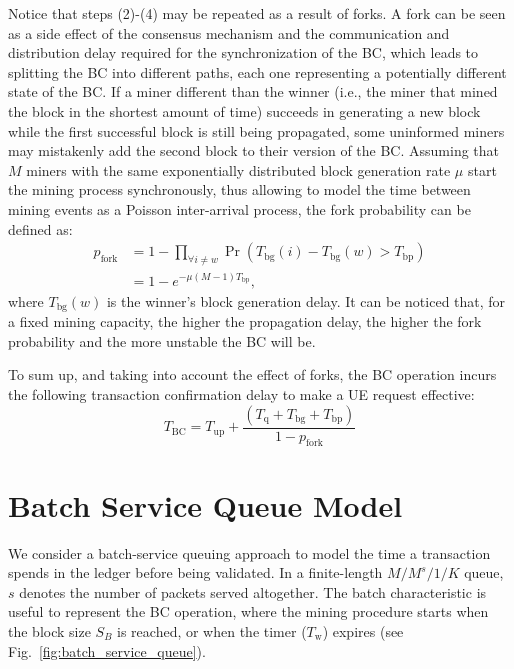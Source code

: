 \documentclass[conference]{IEEEtran}
\theoremstyle{definition}
\begin{document}
Notice that steps (2)-(4) may be repeated as a result of forks. A fork can be seen as a side effect of the consensus mechanism and the communication and distribution delay required for the synchronization of the BC, which leads to splitting the BC into different paths, each one representing a potentially different state of the BC. If a miner different than the winner (i.e., the miner that mined the block in the shortest amount of time) succeeds in generating a new block while the first successful block is still being propagated, some uninformed miners may mistakenly add the second block to their version of the BC. Assuming that $M$ miners with the same exponentially distributed block generation rate $\mu$ start the mining process synchronously, thus allowing to model the time between mining events as a Poisson inter-arrival process, the fork probability can be defined as:
\begin{equation}
\begin{split}
    p_\text{fork} &= 1 - \prod_{\forall i \neq w} \Pr(T_\text{bg}(i) - T_\text{bg}(w) > T_\text{bp}) \\&= 1 - e^{-\mu (M-1)T_\text{bp}},
\end{split}
\label{eq:fork_probability}
\end{equation}
where $T_\text{bg}(w)$ is the winner's block generation delay. It can be noticed that, for a fixed mining capacity, the higher the propagation delay, the higher the fork probability and the more unstable the BC will be.

To sum up, and taking into account the effect of forks, the BC operation incurs the following transaction confirmation delay to make a UE request effective:
\begin{equation}
    T_\text{BC} = T_\text{up} + \frac{(T_\text{q} + T_\text{bg} + T_\text{bp})}{1-p_\text{fork}}
\end{equation}

\section{Batch Service Queue Model}
\label{section:queue_model}

We consider a batch-service queuing approach to model the time a transaction spends in the ledger before being validated. In a finite-length $M/M^s/1/K$ queue, $s$ denotes the number of packets served altogether. The batch characteristic is useful to represent the BC operation, where the mining procedure starts when the block size $S_B$ is reached, or when the timer ($T_\text{w}$) expires (see Fig.~\ref{fig:batch_service_queue}). 
\end{document}
